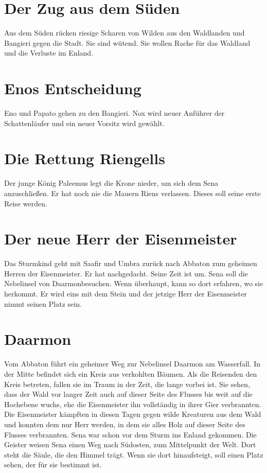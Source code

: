 \documentclass[12pt,a4paper,onecolumn,twoside,ngerman]{book}
\newcommand{\Sena}{Sena}
\newcommand{\Sturmkind}{Sturmkind}
\newcommand{\Bangiri}{Bangieri}
\newcommand{\Papato}{Papato}
\newcommand{\Enland}{Enland}
\newcommand{\Schattenlaufer}{Schattenläufer}
\newcommand{\Eno}{Eno}
\newcommand{\Nox}{Nox}
\newcommand{\Umbra}{Umbra}
\newcommand{\Rhingell}{Riengell}
\newcommand{\Rhin}{Rien}
\newcommand{\Palemus}{Paleemus}
\newcommand{\Darmon}{Daarmon}
\newcommand{\Eisenmeister}{Eisenmeister}
\newcommand{\Abaton}{Abbaton}
\newcommand{\Safir}{Saafir}
\begin{document}
\section{Der Zug aus dem Süden}
Aus dem Süden rücken riesige Scharen von Wilden aus den Waldlanden und {\Bangiri} gegen die Stadt. Sie sind wütend. Sie wollen Rache für das Waldland und die Verluste im {\Enland}.

\section{{\Eno}s Entscheidung}
{\Eno} und {\Papato} gehen zu den {\Bangiri}.\linebreak
{\Nox} wird neuer Anführer der {\Schattenlaufer} und ein neuer Vorsitz wird gewählt.

\section{Die Rettung \Rhingell{s}}
Der junge König {\Palemus} legt die Krone nieder, um sich dem {\Sena} anzuschließen. Er hat noch nie die Mauern \Rhin{s} verlassen. Dieses soll seine erste Reise werden.

\section{Der neue Herr der {\Eisenmeister}}
Das {\Sturmkind} geht mit {\Safir} und {\Umbra} zurück nach {\Abaton} zum geheimen Herren der {\Eisenmeister}.\linebreak
Er hat nachgedacht. Seine Zeit ist um. {\Sena} soll die Nebelinsel von \Darmon besuchen. Wenn überhaupt, kann so dort erfahren, wo sie herkommt. Er wird eins mit dem Stein und der jetzige Herr der {\Eisenmeister} nimmt seinen Platz sein.

\section{\Darmon}
Vom {\Abaton} führt ein geheimer Weg zur Nebelinsel {\Darmon} am Wasserfall. In der Mitte befindet sich ein Kreis aus verkohlten Bäumen.\linebreak
Als die Reisenden den Kreis betreten, fallen sie im Traum in der Zeit, die lange vorbei ist. Sie sehen, dass der Wald vor langer Zeit auch auf dieser Seite des Flusses bis weit auf die Hochebene wuchs, ehe die {\Eisenmeister} ihn vollständig in ihrer Gier verbrannten. Die {\Eisenmeister} kämpften in diesen Tagen gegen wilde Kreaturen aus dem Wald und konnten dem nur Herr werden, in dem sie alles Holz auf dieser Seite des Flusses verbrannten.\linebreak
{\Sena} war schon vor dem Sturm ins {\Enland} gekommen. Die Geister weisen {\Sena} einen Weg nach Südosten, zum Mittelpunkt der Welt. Dort steht die Säule, die den Himmel trägt. Wenn sie dort hinaufsteigt, soll einen Platz sehen, der für sie bestimmt ist.

\end{document}
